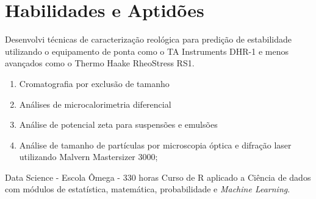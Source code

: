 \section{Habilidades e Aptidões}

{Desenvolvi técnicas de caracterização reológica para 
predição de estabilidade utilizando o 
equipamento de ponta como o TA Instruments DHR-1 e 
menos avançados como o Thermo Haake RheoStress RS1.}\hfill
{}\hfill

\hfill
{}


{
    \begin{enumerate}
        \item Cromatografia por exclusão de tamanho
        \item Análises de microcalorimetria diferencial
        \item Análise de potencial zeta para suspensões e emulsões
        \item Análise de tamanho de partículas por microscopia óptica e difração laser utilizando Malvern Mastersizer 3000;
    \end{enumerate}
    }\hfill
{}
    
\skill
{Data Science - Escola Ômega - 330 horas}
{}
{
Curso de R aplicado a Ciência de dados com módulos de
estatística, matemática, probabilidade e \emph{Machine Learning}.
}
